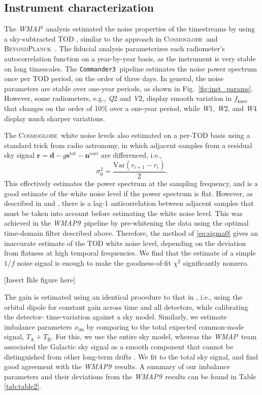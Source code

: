 \documentclass[twocolumn]{../../common/aa}
\def\WMAP{\emph{WMAP}}
\def\WMAPnine{\emph{WMAP9}}
\def\commanderthree{\texttt{Commander3}}
\newcommand{\BP}{\textsc{BeyondPlanck}}
\newcommand{\Cosmoglobe}{\textsc{Cosmoglobe}}
\newcommand{\Q}[0]{\textit Q}
\newcommand{\V}[0]{\textit V}
\newcommand{\W}[0]{\textit W}
\begin{document}
\subsection{Instrument characterization}

The \WMAP\ analysis estimated the noise properties of the timestreams by using a sky-subtracted TOD \citep{jarosik2007}, similar to the approach in \Cosmoglobe\ and \BP\ \citep{bp06}. The fiducial analysis parameterizes each radiometer's autocorrelation function on a year-by-year basis, as the instrument is very stable on long timescales. The \commanderthree\ pipeline estimates the noise power spectrum once per TOD period, on the order of three days. In general, the noise parameters are stable over one-year periods, as shown in Fig.~\ref{fig:inst_params}. However, some radiometers, e.g., \Q2 and \V2, display smooth variation in $f_\mathrm{knee}$ that changes on the order of 10\% over a one-year period, while \W1, \W2, and \W4 display much sharper variations.

The \Cosmoglobe\ white noise levels also estimated on a per-TOD basis using a standard trick from radio astronomy, in which adjacent samples from a residual sky signal $\boldsymbol r =\boldsymbol d-g\boldsymbol s^\mathrm{tot}-\boldsymbol n^\mathrm{corr}$ are differenced, i.e.,
\begin{equation}
	\sigma_0^2=\frac{\mathrm{Var}(r_{i+1}-r_i)}2.
	\label{eq:sigma0}
\end{equation}
This effectively estimates the power spectrum at the sampling frequency, and is a good estimate of the white noise level if the power spectrum is flat. However, as described in \citet{jarosik2003:MAP} and \citet{jarosik2007}, there is a lag-1 anticorrelation between adjacent samples that must be taken into account before estimating the white noise level. This was achieved in the \WMAPnine\ pipeline by pre-whitening the data using the optimal time-domain filter described above. Therefore, the method of \eqref{eq:sigma0} gives an inaccurate estimate of the TOD white noise level, depending on the deviation from flatness at high temporal frequencies. We find that the estimate of a simple $1/f$ noise signal is enough to make the goodness-of-fit $\chi^2$ significantly nonzero.

[Insert Ihle figure here]

The gain is estimated using an identical procedure to that in \citep{bp07}, i.e., using the orbital dipole for constant gain across time and all detectors, while calibrating the detector- time-variation against a sky model. Similarly, we estimate imbalance parameters $x_\mathrm{im}$ by comparing to the total expected common-mode signal, $T_\mathrm A+T_\mathrm B$. For this, we use the entire sky model, whereas the \WMAP\ team associated the Galactic sky signal as a smooth component that cannot be distinguished from other long-term drifts \citep{hinshaw2003a}. We fit to the total sky signal, and find good agreement with the \WMAPnine\ results. A summary of our imbalance parameters and their deviations from the \WMAPnine\ results can be found in Table \ref{tab:table2}.
\end{document}

